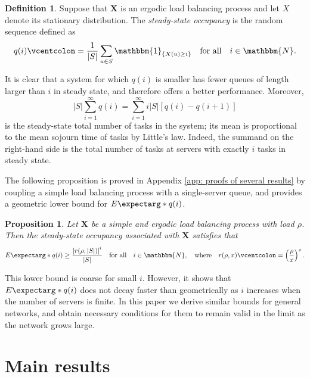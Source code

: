 \documentclass[a4paper, 12pt]{article}
\newtheorem{proposition}{Proposition}
\theoremstyle{definition}
\newtheorem{definition}{Definition}
\newcommand{\ind}[1]{\mathbbm{1}_{\left\{#1\right\}}}
\newcommand{\defeq}{\vcentcolon=}
\newcommand{\bX}{\boldsymbol{X}}
\newcommand{\N}{\mathbbm{N}}
\newcommand{\expect}{E\expectarg}
\begin{document}
\begin{definition}
	\label{def: occupancy state}
	Suppose that $\bX$ is an ergodic load balancing process and let $X$ denote its stationary distribution. The \emph{steady-state occupancy} is the random sequence defined as
	\begin{equation*}
		q(i) \defeq \frac{1}{|S|}\sum_{u \in S} \ind{X(u) \geq i} \quad \text{for all} \quad i \in \N.
	\end{equation*} 
\end{definition}

It is clear that a system for which $q(i)$ is smaller has fewer queues of length larger than $i$ in steady state, and therefore offers a better performance. Moreover,
\begin{equation*}
	|S|\sum_{i = 1}^\infty q(i) = \sum_{i = 1}^\infty i|S|\left[q(i) - q(i + 1)\right]
\end{equation*}
is the steady-state total number of tasks in the system; its mean is proportional to the mean sojourn time of tasks by Little's law. Indeed, the summand on the right-hand side is the total number of tasks at servers with exactly $i$ tasks in steady state.

The following proposition is proved in Appendix \ref{app: proofs of several results} by coupling a simple load balancing process with a single-server queue, and provides a geometric lower bound for $\expect*{q(i)}$.

\begin{proposition}
	\label{prop: simple load balancing processes}
	Let $\bX$ be a simple and ergodic load balancing process with load $\rho$. Then the steady-state occupancy associated with $\bX$ satisfies that
	\begin{equation*}
		\expect*{q(i)} \geq \frac{\left[r(\rho, |S|)\right]^i}{|S|} \quad \text{for all} \quad i \in \N, \quad \text{where} \quad r(\rho, x) \defeq \left(\frac{\rho}{x}\right)^x.
	\end{equation*}
\end{proposition}

This lower bound is coarse for small $i$. However, it shows that $\expect*{q(i)}$ does not decay faster than geometrically as $i$ increases when the number of servers is finite. In this paper we derive similar bounds for general networks, and obtain necessary conditions for them to remain valid in the limit as the network grows large.

\section{Main results}
\label{sec: main results}
\end{document}
